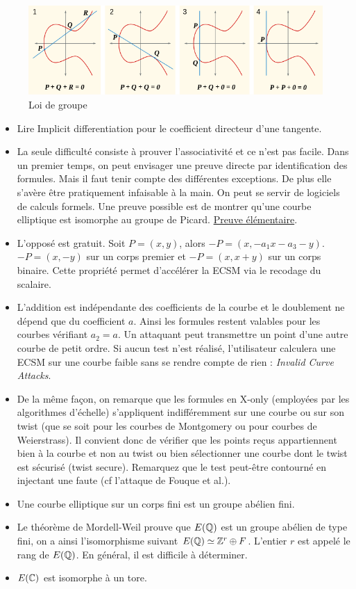 \begin{figure}[ht]
\centering
    \includegraphics[scale=0.5]{images/EC_group.png}
    \caption{Loi de groupe}
    \label{fig:EC_group}
\end{figure}

\begin{itemize}[label=--]
    \item Lire Implicit differentiation pour le coefficient directeur d'une tangente.
    \item La seule difficulté consiste à prouver l'associativité et ce n'est pas facile. Dans un premier temps, on peut envisager une preuve directe par identification des formules. Mais il faut tenir compte des différentes exceptions. De plus elle s'avère être pratiquement infaisable à la main. On peut se servir de logiciels de calculs formels. Une preuve possible est de montrer qu'une courbe elliptique est isomorphe au groupe de Picard. \href{http://math.rice.edu/~friedl/papers/AAELLIPTIC.PDF}{Preuve élémentaire}.
    \item L'opposé est gratuit. Soit $P = (x, y)$, alors $-P = (x, -a_1x - a_3 - y)$. $-P = (x, -y)$ sur un corps premier et $-P = (x, x+y)$ sur un corps binaire. Cette propriété permet d'accélérer la ECSM via le recodage du scalaire.
    \item L'addition est indépendante des coefficients de la courbe et le doublement ne dépend que du coefficient $a$. Ainsi les formules restent valables pour les courbes vérifiant $a_2 = a$. Un attaquant peut transmettre un point d'une autre courbe de petit ordre. Si aucun test n'est réalisé, l'utilisateur calculera une ECSM sur une courbe faible sans se rendre compte de rien : \emph{Invalid Curve Attacks}. 
    \item De la même façon, on remarque que les formules en X-only (employées par les algorithmes d'échelle) s'appliquent indifféremment sur une courbe ou sur son twist (que se soit pour les courbes de Montgomery ou pour courbes de Weierstrass). Il convient donc de vérifier que les points reçus appartiennent bien à la courbe et non au twist ou bien sélectionner une courbe dont le twist est sécurisé (twist secure). Remarquez que le test peut-être contourné en injectant une faute (cf l'attaque de Fouque et al.).
    \item Une courbe elliptique sur un corps fini est un groupe abélien fini.
    \item Le théorème de Mordell-Weil prouve que $E(\mathbb{Q})$ est un groupe abélien de type fini, on a ainsi l'isomorphisme suivant $E(\mathbb{Q}) \simeq \mathbb{Z}^r \oplus F$. L'entier $r$ est appelé le rang de $E(\mathbb{Q})$. En général, il est difficile à déterminer.
    \item $E(\mathbb{C})$ est isomorphe à un tore.
\end{itemize}


